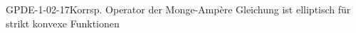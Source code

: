 
\begin{EXA}{GPDE-1-02-17}{Korrsp. Operator der Monge-Ampère Gleichung ist elliptisch für strikt konvexe Funktionen}
\end{EXA}
